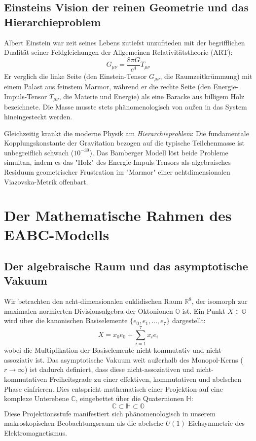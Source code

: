 \documentclass[11pt,a4paper]{article}
\newcommand{\R}{\mathbb{R}}
\newcommand{\C}{\mathbb{C}}
\newcommand{\Halg}{\mathbb{H}}
\newcommand{\Oalg}{\mathbb{O}}
\begin{document}
\subsection{Einsteins Vision der reinen Geometrie und das Hierarchieproblem}
Albert Einstein war zeit seines Lebens zutiefst unzufrieden mit der begrifflichen Dualität seiner Feldgleichungen der Allgemeinen Relativitätstheorie (ART):
\begin{equation}
G_{\mu\nu} = \frac{8\pi G}{c^4} T_{\mu\nu}
\end{equation}
Er verglich die linke Seite (den Einstein-Tensor $G_{\mu\nu}$, die Raumzeitkrümmung) mit einem Palast aus feinstem Marmor, während er die rechte Seite (den Energie-Impuls-Tensor $T_{\mu\nu}$, die Materie und Energie) als eine Baracke aus billigem Holz bezeichnete. Die Masse musste stets phänomenologisch von außen in das System hineingesteckt werden. 

Gleichzeitig krankt die moderne Physik am \textit{Hierarchieproblem}: Die fundamentale Kopplungskonstante der Gravitation bezogen auf die typische Teilchenmasse ist unbegreiflich schwach ($10^{-39}$). Das Bamberger Modell löst beide Probleme simultan, indem es das "Holz" des Energie-Impuls-Tensors als algebraisches Residuum geometrischer Frustration im "Marmor" einer achtdimensionalen Viazovska-Metrik offenbart.

\section{Der Mathematische Rahmen des EABC-Modells}

\subsection{Der algebraische Raum und das asymptotische Vakuum}
Wir betrachten den acht-dimensionalen euklidischen Raum $\R^8$, der isomorph zur maximalen normierten Divisionsalgebra der Oktonionen $\Oalg$ ist. Ein Punkt $X \in \Oalg$ wird über die kanonischen Basiselemente $\{e_0, e_1, \dots, e_7\}$ dargestellt:
\begin{equation}
X = x_0 e_0 + \sum_{i=1}^7 x_i e_i
\end{equation}
wobei die Multiplikation der Basiselemente nicht-kommutativ und nicht-assoziativ ist. Das asymptotische Vakuum weit außerhalb des Monopol-Kerns ($r \rightarrow \infty$) ist dadurch definiert, dass diese nicht-assoziativen und nicht-kommutativen Freiheitsgrade zu einer effektiven, kommutativen und abelschen Phase einfrieren. Dies entspricht mathematisch einer Projektion auf eine komplexe Unterebene $\C$, eingebettet über die Quaternionen $\Halg$:
\begin{equation}
\C \subset \Halg \subset \Oalg
\end{equation}
Diese Projektionsstufe manifestiert sich phänomenologisch in unserem makroskopischen Beobachtungsraum als die abelsche $U(1)$-Eichsymmetrie des Elektromagnetismus.
\end{document}
